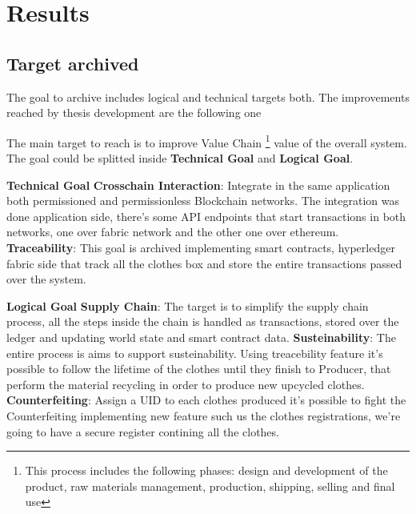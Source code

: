 \chapter{Results}

\section{Target archived}

The goal to archive includes logical and technical targets both. 
The improvements reached by thesis development are the following one

\newline
The main target to reach is to improve Value Chain \footnote{This process includes the following phases: design and development of the product,
raw materials management, production, shipping, selling and final use} value of the overall system.
\newline
The goal could be splitted inside \textbf{Technical Goal} and \textbf{Logical Goal}.

\begin{outline}
    \1 \textbf{Technical Goal}
    \2 \textbf{Crosschain Interaction}: Integrate in the same application both permissioned and permissionless
    Blockchain networks. The integration was done application side, there's some API endpoints that start
    transactions in both networks, one over fabric network and the other one over ethereum.
    \2 \textbf{Traceability}: This goal is archived implementing smart contracts, hyperledger fabric side
    that track all the clothes box and store the entire transactions passed over the system. 
    
    \1 \textbf{Logical Goal}
    \2 \textbf{Supply Chain}: The target is to simplify the supply chain process, all the steps inside the chain
    is handled as transactions, stored over the ledger and updating world state and smart contract data. 
    \2 \textbf{Susteinability}: The entire process is aims to support susteinability. Using treacebility feature
    it's possible to follow the lifetime of the clothes until they finish to Producer, that perform the 
    material recycling in order to produce new upcycled clothes.   
    \2 \textbf{Counterfeiting}: Assign a UID to each clothes produced it's possible to fight the Counterfeiting
    implementing new feature such us the clothes registrations, we're going to have a secure register contining
    all the clothes.
\end{outline}

